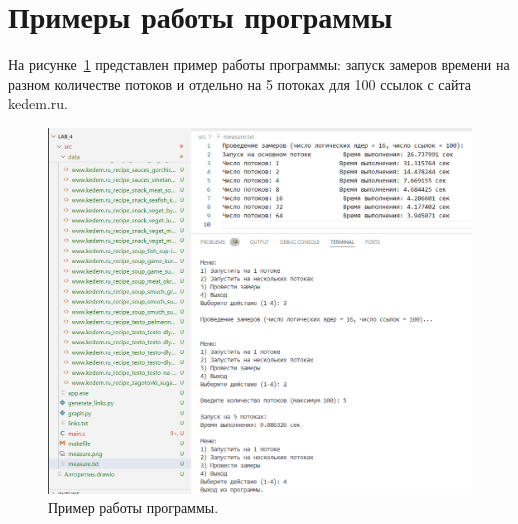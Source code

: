 \section{Примеры работы программы}

\hspace{1.25cm}
На рисунке~\ref{fig:img_example} представлен пример работы программы: запуск замеров времени на разном количестве потоков и отдельно на 5 потоках для 100 ссылок с сайта kedem.ru.

\begin{figure}[h]
    \centering
    \includegraphics[width=\linewidth]{img/example.png}
    \caption{Пример работы программы.}
    \label{fig:img_example}
\end{figure}
